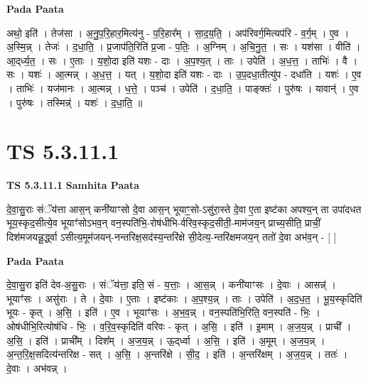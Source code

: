 \documentclass[17pt]{extarticle}
\begin{document}
\textbf{Pada Paata} \newline

अथो॒ इति॑ । तेज॑सा । अ॒नु॒प॒रि॒हार॒मित्य॑नु - प॒रि॒हार᳚म् । सा॒द॒य॒ति॒ । अप॑रिवर्ग॒मित्यप॑रि - व॒र्ग॒म् । ए॒व । अ॒स्मि॒न्न् । तेजः॑ । द॒धा॒ति॒ । प्र॒जाप॑ति॒रिति॑ प्र॒जा - प॒तिः॒ । अ॒ग्निम् । अ॒चि॒नु॒त॒ । सः । यश॑सा । वीति॑ । आ॒द्‌र्ध्य॒त॒ । सः । ए॒ताः । य॒शो॒दा इति॑ यशः - दाः । अ॒प॒श्य॒त् । ताः । उपेति॑ । अ॒ध॒त्त॒ । ताभिः॑ । वै । सः । यशः॑ । आ॒त्मन्न् । अ॒ध॒त्त॒ । यत् । य॒शो॒दा इति॑ यशः - दाः । उ॒प॒दधा॒तीत्यु॑प - दधा॑ति । यशः॑ । ए॒व । ताभिः॑ । यज॑मानः । आ॒त्मन्न् । ध॒त्ते॒ । पञ्च॑ । उपेति॑ । द॒धा॒ति॒ । पाङ्क्तः॑ । पुरु॑षः । यावान्॑ । ए॒व । पुरु॑षः । तस्मिन्न्॑ । यशः॑ । द॒धा॒ति॒ ॥  \newline




\section*{ TS 5.3.11.1 }

\textbf{TS 5.3.11.1 } \newline
\textbf{Samhita Paata} \newline

दे॒वा॒सु॒राः संॅय॑त्ता आस॒न् कनी॑याꣳसो दे॒वा आस॒न् भूयाꣳ॒॒सो-ऽसु॑रा॒स्ते दे॒वा ए॒ता इष्ट॑का अपश्य॒न् ता उपा॑दधत भूय॒स्कृद॒सीत्ये॒व भूयाꣳ॑सोऽभव॒न् वन॒स्पति॑भि॒-रोष॑धीभि-र्वरिव॒स्कृद॒सीती॒-माम॑जय॒न् प्राच्य॒सीति॒ प्राचीं॒ दिश॑मजयन्नू॒र्द्ध्वा ऽसीत्य॒मूम॑जयन्-नन्तरिक्ष॒सद॑स्य॒न्तरि॑क्षे सी॒देत्य॒-न्तरि॑क्षमजय॒न् ततो॑ दे॒वा अभ॑व॒न् - [  ] \newline

\textbf{Pada Paata} \newline

दे॒वा॒सु॒रा इति॑ देव-अ॒सु॒राः । संॅय॑त्ता॒ इति॒ सं - य॒त्ताः॒ । आ॒स॒न्न् । कनी॑याꣳसः । दे॒वाः । आसन्न्॑ । भूयाꣳ॑सः । असु॑राः । ते । दे॒वाः । ए॒ताः । इष्ट॑काः । अ॒प॒श्य॒न्न् । ताः । उपेति॑ । अ॒द॒ध॒त॒ । भू॒य॒स्कृदिति॑ भूयः - कृत् । अ॒सि॒ । इति॑ । ए॒व । भूयाꣳ॑सः । अ॒भ॒व॒न्न् । वन॒स्पति॑भि॒रिति॒ वन॒स्पति॑ - भिः॒ । ओष॑धीभि॒रित्योष॑धि - भिः॒ । व॒रि॒व॒स्कृदिति॑ वरिवः - कृत् । अ॒सि॒ । इति॑ । इ॒माम् । अ॒ज॒य॒न्न् । प्राची᳚ । अ॒सि॒ । इति॑ । प्राची᳚म् । दिश᳚म् । अ॒ज॒य॒न्न् । ऊ॒द्‌र्ध्वा । अ॒सि॒ । इति॑ । अ॒मूम् । अ॒ज॒य॒न्न् । अ॒न्त॒रि॒क्ष॒सदित्य॑न्तरिक्ष - सत् । अ॒सि॒ । अ॒न्तरि॑क्षे । सी॒द॒ । इति॑ । अ॒न्तरि॑क्षम् । अ॒ज॒य॒न्न् । ततः॑ । दे॒वाः । अभ॑वन्न् ।  \newline
\end{document}
